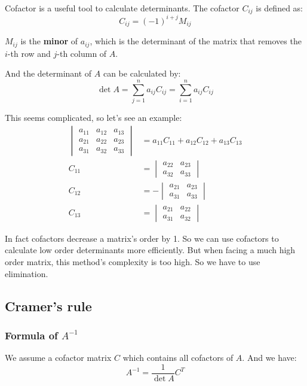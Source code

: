 \documentclass[12pt]{ctexart}
\begin{document}
Cofactor is a useful tool to calculate determinants. The cofactor $C_{ij}$ is defined as:
\[
  C_{ij} = (-1)^{i+j}M_{ij}
\]

$M_{ij}$ is the \textbf{minor} of $a_{ij}$, which is the determinant of the matrix that
removes the $i$-th row and $j$-th column of $A$.

And the determinant of $A$ can be calculated by:
\[
  \det A = \sum_{j=1}^{n} a_{ij}C_{ij} = \sum_{i=1}^{n} a_{ij}C_{ij}
\]

This seems complicated, so let's see an example:
\begin{align*}
  \begin{vmatrix}
    a_{11} & a_{12} & a_{13} \\
    a_{21} & a_{22} & a_{23} \\
    a_{31} & a_{32} & a_{33}
  \end{vmatrix} &=
  a_{11}C_{11} + a_{12}C_{12} + a_{13}C_{13} \\
  C_{11} &= \begin{vmatrix}
    a_{22} & a_{23} \\
    a_{32} & a_{33}
  \end{vmatrix} \\
  C_{12} &= - \begin{vmatrix}
    a_{21} & a_{23} \\
    a_{31} & a_{33}
  \end{vmatrix} \\
  C_{13} &= \begin{vmatrix}
    a_{21} & a_{22} \\
    a_{31} & a_{32}
  \end{vmatrix}
\end{align*}

In fact cofactors decrease a matrix's order by 1. So we can use cofactors to calculate
low order determinants more efficiently. But when facing a much high order matrix, this
method's complexity is too high. So we have to use elimination.

\subsection{\textbf{Cramer's rule}}
\subsubsection{\textbf{Formula of $A^{-1}$}}

We assume a cofactor matrix $C$ which contains all cofactors of $A$. And we have:
\[
  A^{-1} = \frac{1}{\det A} C^{T}
\]
\end{document}
